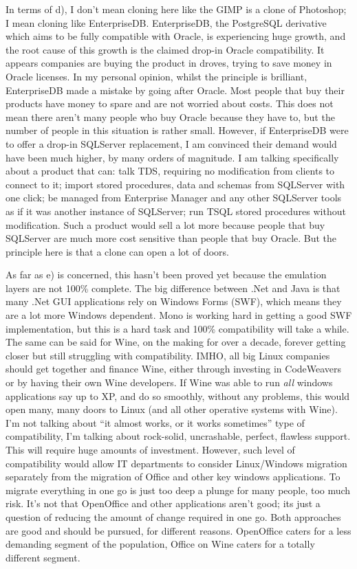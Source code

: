 \documentclass{book}
\begin{document}
In terms of d), I don't mean cloning here like the GIMP is a clone of
Photoshop; I mean cloning like EnterpriseDB. EnterpriseDB, the
PostgreSQL derivative which aims to be fully compatible with Oracle,
is experiencing huge growth, and the root cause of this growth is the
claimed drop-in Oracle compatibility. It appears companies are buying
the product in droves, trying to save money in Oracle licenses. In my
personal opinion, whilst the principle is brilliant, EnterpriseDB made
a mistake by going after Oracle. Most people that buy their products
have money to spare and are not worried about costs. This does not
mean there aren't many people who buy Oracle because they have to, but
the number of people in this situation is rather small. However, if
EnterpriseDB were to offer a drop-in SQLServer replacement, I am
convinced their demand would have been much higher, by many orders of
magnitude. I am talking specifically about a product that can: talk
TDS, requiring no modification from clients to connect to it; import
stored procedures, data and schemas from SQLServer with one click; be
managed from Enterprise Manager and any other SQLServer tools as if it
was another instance of SQLServer; run TSQL stored procedures without
modification. Such a product would sell a lot more because people that
buy SQLServer are much more cost sensitive than people that buy
Oracle. But the principle here is that a clone can open a lot of
doors.

As far as e) is concerned, this hasn't been proved yet because the
emulation layers are not 100\% complete. The big difference between
.Net and Java is that many .Net GUI applications rely on Windows Forms
(SWF), which means they are a lot more Windows dependent. Mono is
working hard in getting a good SWF implementation, but this is a hard
task and 100\% compatibility will take a while. The same can be said
for Wine, on the making for over a decade, forever getting closer but
still struggling with compatibility. IMHO, all big Linux companies
should get together and finance Wine, either through investing in
CodeWeavers or by having their own Wine developers. If Wine was able
to run \emph{all} windows applications say up to XP, and do so
smoothly, without any problems, this would open many, many doors to
Linux (and all other operative systems with Wine). I'm not talking
about ``it almost works, or it works sometimes'' type of compatibility,
I'm talking about rock-solid, uncrashable, perfect, flawless
support. This will require huge amounts of investment. However, such
level of compatibility would allow IT departments to consider
Linux/Windows migration separately from the migration of Office and
other key windows applications. To migrate everything in one go is
just too deep a plunge for many people, too much risk. It's not that
OpenOffice and other applications aren't good; its just a question of
reducing the amount of change required in one go. Both approaches are
good and should be pursued, for different reasons. OpenOffice caters
for a less demanding segment of the population, Office on Wine caters
for a totally different segment.
\end{document}

